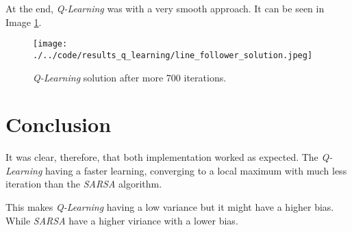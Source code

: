 \documentclass[journal]{IEEEtran}
\begin{document}
At the end, \textit{Q-Learning} was with a very smooth approach. It can be seen in Image \ref{img:qlearning_solution}.

\begin{figure}
  \begin{center}
  \texttt{[image: ./../code/results\_q\_learning/line\_follower\_solution.jpeg]}
  \caption{\textit{Q-Learning} solution after more 700 iterations.}
  \label{img:qlearning_solution}
  \end{center}
\end{figure}

\section {Conclusion}

It was clear, therefore, that both implementation worked as expected. The \textit{Q-Learning} having a faster learning, converging to a local maximum with much less iteration than the \textit{SARSA} algorithm.

This makes \textit{Q-Learning} having a low variance but it might have a higher bias. While \textit{SARSA} have a higher viriance with a lower bias.

\vfill
\end{document}
